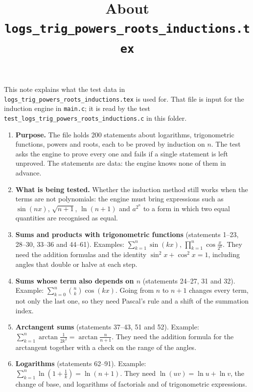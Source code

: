\documentclass[11pt,a4paper]{article}
\title{About \texttt{logs\_trig\_powers\_roots\_inductions.tex}}
\author{}
\date{}
\begin{document}
\maketitle
This note explains what the test data in \texttt{logs\_trig\_powers\_roots\_inductions.tex} is used for. That file is input for the induction engine in \texttt{main.c}; it is read by the test \texttt{test\_logs\_trig\_powers\_roots\_inductions.c} in this folder.

\begin{enumerate}
\item \textbf{Purpose.} The file holds 200 statements about logarithms, trigonometric functions, powers and roots, each to be proved by induction on $n$. The test asks the engine to prove every one and fails if a single statement is left unproved. The statements are data: the engine knows none of them in advance.

\item \textbf{What is being tested.} Whether the induction method still works when the terms are not polynomials: the engine must bring expressions such as $\sin(n x)$, $\sqrt{n + 1}$, $\ln(n + 1)$ and $a^{2^{n}}$ to a form in which two equal quantities are recognised as equal.

\item \textbf{Sums and products with trigonometric functions} (statements 1--23, 28--30, 33--36 and 44--61). Examples: $\displaystyle \sum_{k=1}^{n} \sin(k x)$, $\displaystyle \prod_{k=1}^{n} \cos\frac{x}{2^{k}}$. They need the addition formulas and the identity $\sin^{2} x + \cos^{2} x = 1$, including angles that double or halve at each step.

\item \textbf{Sums whose term also depends on $n$} (statements 24--27, 31 and 32). Example: $\displaystyle \sum_{k=0}^{n} \binom{n}{k} \cos(k x)$. Going from $n$ to $n + 1$ changes every term, not only the last one, so they need Pascal's rule and a shift of the summation index.

\item \textbf{Arctangent sums} (statements 37--43, 51 and 52). Example: $\displaystyle \sum_{k=1}^{n} \arctan\frac{1}{2k^{2}} = \arctan\frac{n}{n + 1}$. They need the addition formula for the arctangent together with a check on the range of the angles.

\item \textbf{Logarithms} (statements 62--91). Example: $\displaystyle \sum_{k=1}^{n} \ln\left(1 + \frac{1}{k}\right) = \ln(n + 1)$. They need $\ln(u v) = \ln u + \ln v$, the change of base, and logarithms of factorials and of trigonometric expressions.


\end{enumerate}
\end{document}
